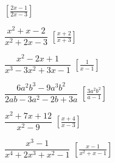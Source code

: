 \begin{esercizio}[\Ast]
\begin{multicols}{2}
\begin{enumeratea}
  \hfill \(\left[\frac{2x-1}{2x-3}\right]\)
 \item \(\dfrac{x^{2}+x-2}{x^{2}+2x-3}\)
  \hfill \(\left[\frac{x+2}{x+3}\right]\)
 \item \(\dfrac{x^{2}-2x+1}{x^{3}-3x^{2}+3x-1}\)
  \hfill \(\left[\frac{1}{x-1}\right]\)
 \item \(\dfrac{6a^{2}b^{3}-9a^{3}b^{2}}{2ab-3a^{2}-2b+3a}\)
  \hfill \(\left[\frac{3a^{2}b^{2}}{a-1}\right]\)
 \item \(\dfrac{x^{2}+7x+12}{x^{2}-9}\)
  \hfill \(\left[\frac{x+4}{x-3}\right]\)
 \item \(\dfrac{x^{3}-1}{x^{4}+2x^{3}+x^{2}-1}\)
  \hfill \(\left[\frac{x-1}{x^2+x-1}\right]\)
\end{enumeratea}
\end{multicols}
\end{esercizio}

